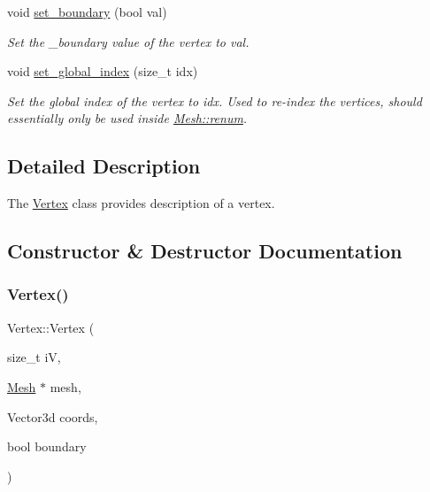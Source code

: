 \begin{DoxyCompactItemize}
void \hyperlink{classHArDCore3D_1_1Vertex_a72fa3131022cb2c847a2e9d5b56cb893}{set\+\_\+boundary} (bool val)
\begin{DoxyCompactList}\small\item\em Set the \+\_\+boundary value of the vertex to val. \end{DoxyCompactList}\item 
\mbox{\label{classHArDCore3D_1_1Vertex_a1acf4d7072729d8f5f89876383361099}} 
void \hyperlink{classHArDCore3D_1_1Vertex_a1acf4d7072729d8f5f89876383361099}{set\+\_\+global\+\_\+index} (size\+\_\+t idx)
\begin{DoxyCompactList}\small\item\em Set the global index of the vertex to idx. Used to re-\/index the vertices, should essentially only be used inside \hyperlink{classHArDCore3D_1_1Mesh_af77873bbc892a7a5b37bf4773c55aefc}{Mesh\+::renum}. \end{DoxyCompactList}\end{DoxyCompactItemize}


\subsection{Detailed Description}
The \hyperlink{classHArDCore3D_1_1Vertex}{Vertex} class provides description of a vertex. 

\subsection{Constructor \& Destructor Documentation}
\mbox{\label{classHArDCore3D_1_1Vertex_a30e7743fc40f1b771b9dad963a9badd1}} 
\subsubsection{\texorpdfstring{Vertex()}{Vertex()}}
{\footnotesize\ttfamily Vertex\+::\+Vertex (\begin{DoxyParamCaption}\item[{size\+\_\+t}]{iV,  }\item[{\hyperlink{classHArDCore3D_1_1Mesh}{Mesh} $\ast$}]{mesh,  }\item[{Vector3d}]{coords,  }\item[{bool}]{boundary }\end{DoxyParamCaption})}

